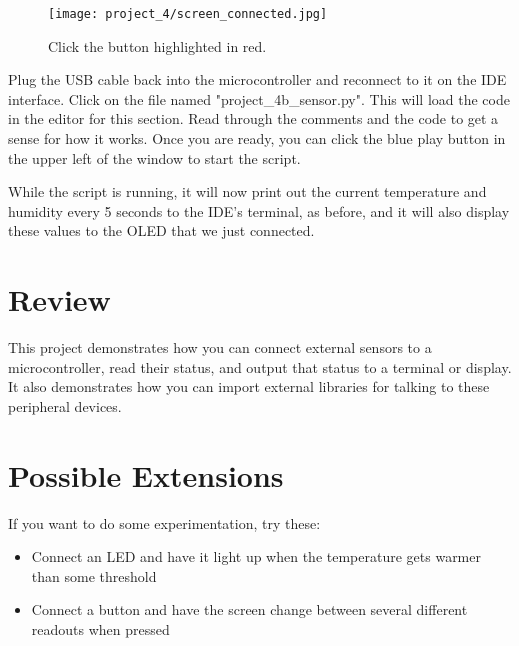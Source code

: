 \begin{figure}[H]
    \centering
    \texttt{[image: project\_4/screen\_connected.jpg]}
    \caption{Click the button highlighted in red.}
\end{figure}

Plug the USB cable back into the microcontroller and reconnect to it on the IDE interface. Click on the
file named "project\_4b\_sensor.py". This will load the code in the editor for this section. Read through
the comments and the code to get a sense for how it works. Once you are ready, you can click the blue play
button in the upper left of the window to start the script.

While the script is running, it will now print out the current temperature and humidity every 5 seconds
to the IDE's terminal, as before, and it will also display these values to the OLED that we just connected.

\section{Review}
This project demonstrates how you can connect external sensors to a microcontroller, read their status,
and output that status to a terminal or display. It also demonstrates how you can import external libraries
for talking to these peripheral devices.

\section{Possible Extensions}
If you want to do some experimentation, try these:

\begin{itemize}
    \item Connect an LED and have it light up when the temperature gets warmer than some threshold
    \item Connect a button and have the screen change between several different readouts when pressed
\end{itemize}
